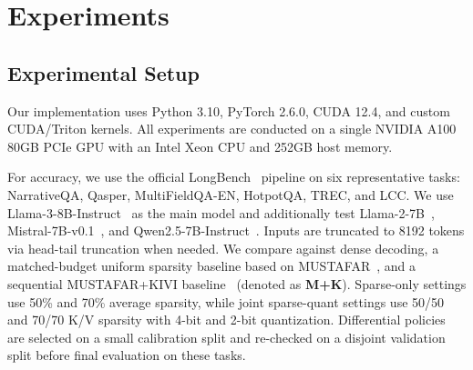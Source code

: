 \documentclass[runningheads]{llncs}
\newcommand{\multifieldqa}{Multi\-FieldQA-EN}
\begin{document}



\section{Experiments}
\label{sec:experiments}

\subsection{Experimental Setup}
Our implementation uses Python 3.10, PyTorch 2.6.0, CUDA 12.4, and custom CUDA/Triton kernels. All experiments are conducted on a single NVIDIA A100 80GB PCIe GPU with an Intel Xeon CPU and 252GB host memory.

For accuracy, we use the official LongBench~\cite{longbench} pipeline on six representative tasks: NarrativeQA, Qasper, \multifieldqa, HotpotQA, TREC, and LCC. We use Llama-3-8B-Instruct~\cite{grattafiori2024llama3} as the main model and additionally test Llama-2-7B~\cite{touvron2023llama2}, Mistral-7B-v0.1~\cite{jiang2023mistral7b}, and Qwen2.5-7B-Instruct~\cite{yang2024qwen25}. Inputs are truncated to 8192 tokens via head-tail truncation when needed. We compare against dense decoding, a matched-budget uniform sparsity baseline based on MUSTAFAR~\cite{joo2025mustafar}, and a sequential MUSTAFAR+KIVI baseline~\cite{liu2024kivi} (denoted as \textbf{M+K}). Sparse-only settings use 50\% and 70\% average sparsity, while joint sparse-quant settings use 50/50 and 70/70 K/V sparsity with 4-bit and 2-bit quantization. Differential policies are selected on a small calibration split and re-checked on a disjoint validation split before final evaluation on these tasks.
\end{document}

